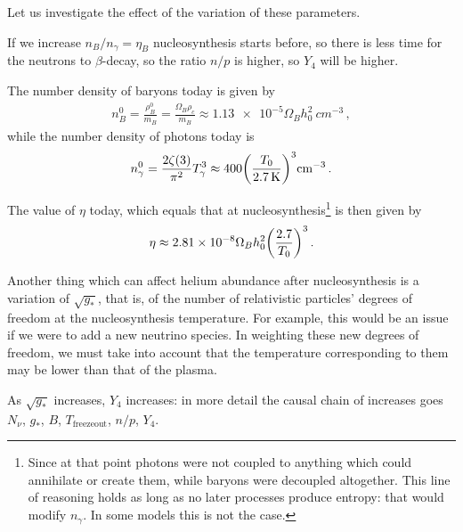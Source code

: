 \documentclass[main.tex]{subfiles}
\begin{document}
Let us investigate the effect of the variation of these parameters.

If we increase \(n_B / n_\gamma = \eta_B\) nucleosynthesis starts before, so there is less time for the neutrons to \(\beta\)-decay, so the ratio \(n/p\) is higher, so \(Y_4 \) will be higher. 


The number density of baryons today is given by 
%
\begin{align}
n^{0}_{B} = \frac{\rho_{B}^{0}}{m_B} = \frac{\Omega_{B} \rho_{c}}{m_B}
\approx \num{1.13e-5} \Omega_{B} h_0^2 \SI{}{cm^{-3}}
\,,
\end{align}
%
while the number density of photons today is 
%
\begin{align}
n_\gamma^{0} = \frac{2 \zeta (3)}{\pi^2} T_\gamma^3 \approx 400 \qty( \frac{T_0 }{\SI{2.7}{K}})^3 \SI{}{cm^{-3}}
\,.
\end{align}

The value of \(\eta\) today, which equals that at nucleosynthesis\footnote{Since at that point photons were not coupled to anything which could annihilate or create them, while baryons were decoupled altogether. This line of reasoning holds as long as no later processes produce entropy: that would modify \(n_\gamma \). In some models this is not the case.}
is then given by 
%
\begin{align}
\eta \approx \num{2.81e-8} \Omega_{B} h_0^2 \qty( \frac{\num{2.7}}{T_0 })^3
\,.
\end{align}

Another thing which can affect helium abundance after nucleosynthesis is a variation of \(\sqrt{g_{*}}\), that is, of the number of relativistic particles' degrees of freedom at the nucleosynthesis temperature. 
For example, this would be an issue if we were to add a new neutrino species. 
In weighting these new degrees of freedom, we must take into account that the temperature corresponding to them may be lower than that of the plasma. 

As \(\sqrt{g_*}\) increases, \(Y_4 \) increases: in more detail the causal chain of increases goes \(N_\nu\), \(g_*\), \(B\), \(T _{\text{freezeout}}\), \(n/p\), \(Y_4 \).


\end{document}

